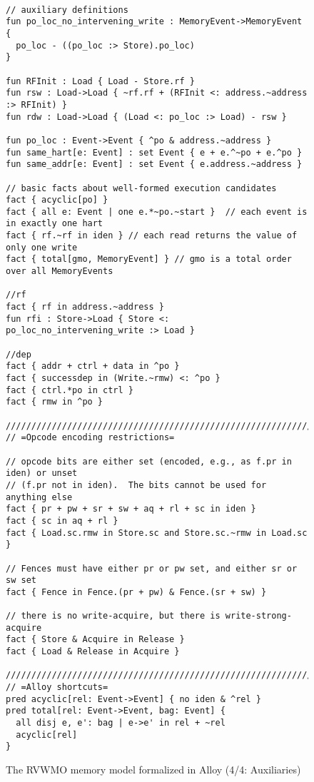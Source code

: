 \begin{figure}[h!]
  {
  \tt\bfseries\centering\footnotesize
  \begin{lstlisting}
// auxiliary definitions
fun po_loc_no_intervening_write : MemoryEvent->MemoryEvent {
  po_loc - ((po_loc :> Store).po_loc)
}

fun RFInit : Load { Load - Store.rf }
fun rsw : Load->Load { ~rf.rf + (RFInit <: address.~address :> RFInit) }
fun rdw : Load->Load { (Load <: po_loc :> Load) - rsw }

fun po_loc : Event->Event { ^po & address.~address }
fun same_hart[e: Event] : set Event { e + e.^~po + e.^po }
fun same_addr[e: Event] : set Event { e.address.~address }

// basic facts about well-formed execution candidates
fact { acyclic[po] }
fact { all e: Event | one e.*~po.~start }  // each event is in exactly one hart
fact { rf.~rf in iden } // each read returns the value of only one write
fact { total[gmo, MemoryEvent] } // gmo is a total order over all MemoryEvents

//rf
fact { rf in address.~address }
fun rfi : Store->Load { Store <: po_loc_no_intervening_write :> Load }

//dep
fact { addr + ctrl + data in ^po }
fact { successdep in (Write.~rmw) <: ^po }
fact { ctrl.*po in ctrl }
fact { rmw in ^po }

////////////////////////////////////////////////////////////////////////////////
// =Opcode encoding restrictions=

// opcode bits are either set (encoded, e.g., as f.pr in iden) or unset
// (f.pr not in iden).  The bits cannot be used for anything else
fact { pr + pw + sr + sw + aq + rl + sc in iden }
fact { sc in aq + rl }
fact { Load.sc.rmw in Store.sc and Store.sc.~rmw in Load.sc }

// Fences must have either pr or pw set, and either sr or sw set
fact { Fence in Fence.(pr + pw) & Fence.(sr + sw) }

// there is no write-acquire, but there is write-strong-acquire
fact { Store & Acquire in Release }
fact { Load & Release in Acquire }

////////////////////////////////////////////////////////////////////////////////
// =Alloy shortcuts=
pred acyclic[rel: Event->Event] { no iden & ^rel }
pred total[rel: Event->Event, bag: Event] {
  all disj e, e': bag | e->e' in rel + ~rel
  acyclic[rel]
}
\end{lstlisting}}
  \caption{The RVWMO memory model formalized in Alloy (4/4: Auxiliaries)}
  \label{fig:alloy4}
\end{figure}

